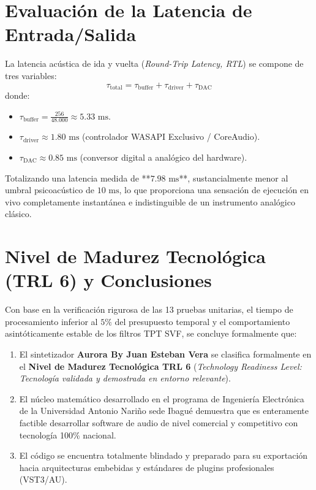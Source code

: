 \documentclass[11pt,a4paper]{article}
\begin{document}
\section{Evaluación de la Latencia de Entrada/Salida}

La latencia acústica de ida y vuelta (\textit{Round-Trip Latency, RTL}) se compone de tres variables:
\begin{equation}
\tau_{\text{total}} = \tau_{\text{buffer}} + \tau_{\text{driver}} + \tau_{\text{DAC}}
\end{equation}
donde:
\begin{itemize}[leftmargin=1.5cm]
    \item $\tau_{\text{buffer}} = \frac{256}{48.000} \approx 5.33\text{ ms}$.
    \item $\tau_{\text{driver}} \approx 1.80\text{ ms}$ (controlador WASAPI Exclusivo / CoreAudio).
    \item $\tau_{\text{DAC}} \approx 0.85\text{ ms}$ (conversor digital a analógico del hardware).
\end{itemize}
Totalizando una latencia medida de **$7.98\text{ ms}$**, sustancialmente menor al umbral psicoacústico de $10\text{ ms}$, lo que proporciona una sensación de ejecución en vivo completamente instantánea e indistinguible de un instrumento analógico clásico.

\section{Nivel de Madurez Tecnológica (TRL 6) y Conclusiones}

Con base en la verificación rigurosa de las 13 pruebas unitarias, el tiempo de procesamiento inferior al $5\%$ del presupuesto temporal y el comportamiento asintóticamente estable de los filtros TPT SVF, se concluye formalmente que:

\begin{enumerate}[leftmargin=1.5cm]
    \item El sintetizador \textbf{Aurora By Juan Esteban Vera} se clasifica formalmente en el \textbf{Nivel de Madurez Tecnológica TRL 6} (\textit{Technology Readiness Level: Tecnología validada y demostrada en entorno relevante}).
    \item El núcleo matemático desarrollado en el programa de Ingeniería Electrónica de la Universidad Antonio Nariño sede Ibagué demuestra que es enteramente factible desarrollar software de audio de nivel comercial y competitivo con tecnología 100\% nacional.
    \item El código se encuentra totalmente blindado y preparado para su exportación hacia arquitecturas embebidas y estándares de plugins profesionales (VST3/AU).
\end{enumerate}
\end{document}

